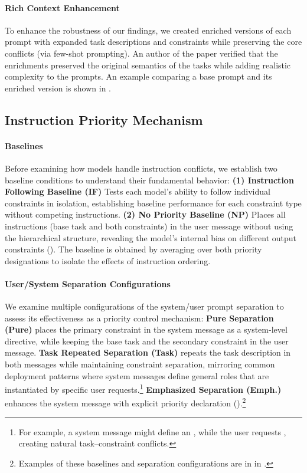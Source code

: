 \paragraph{Rich Context Enhancement} To enhance the robustness of our findings, we created enriched versions of each prompt with expanded task descriptions and constraints while preserving the core conflicts (via few-shot prompting). An author of the paper verified that the enrichments preserved the original semantics of the tasks while adding realistic complexity to the prompts. An example comparing a base prompt and its enriched version is shown in .

\subsection{Instruction Priority Mechanism}\label{sec:mechanism}

\paragraph{Baselines} \label{sec:baselines}
Before examining how models handle instruction conflicts, we establish two baseline conditions to understand their fundamental behavior:
\textbf{(1) Instruction Following Baseline (IF)} Tests each model's ability to follow individual constraints in isolation, establishing baseline performance for each constraint type without competing instructions.
\textbf{(2) No Priority Baseline (NP)} Places all instructions (base task and both constraints) in the user message without using the hierarchical structure, revealing the model's internal bias on different output constraints (). The baseline is obtained by averaging over both priority designations to isolate the effects of instruction ordering. 


\paragraph{User/System Separation Configurations}
We examine multiple configurations of the system/user prompt separation to assess its effectiveness as a priority control mechanism:
\textbf{Pure Separation (Pure)} places the primary constraint in the system message as a system-level directive, while keeping the base task and the secondary constraint in the user message.
\textbf{Task Repeated Separation (Task)} repeats the task description in both messages while maintaining constraint separation, mirroring common deployment patterns where system messages define general roles that are instantiated by specific user requests.\footnote{For example, a system message might define an , while the user requests , creating natural task--constraint conflicts.}
\textbf{Emphasized Separation (Emph.)} enhances the system message with explicit priority declaration ().\footnote{Examples of these baselines and separation configurations are in  in .}

